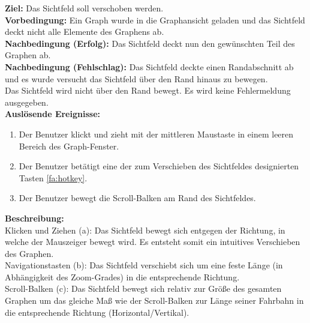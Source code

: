 \label{fa:verschieben}
\textbf{Ziel:} Das Sichtfeld soll verschoben werden.\\
\textbf{Vorbedingung:} Ein Graph wurde in die Graphansicht geladen und das Sichtfeld deckt nicht alle Elemente des Graphens ab.\\
\textbf{Nachbedingung (Erfolg):}  Das Sichtfeld deckt nun den gewünschten Teil des Graphen ab.\\
\textbf{Nachbedingung (Fehlschlag):} Das Sichtfeld deckte einen Randabschnitt ab und es wurde versucht das Sichtfeld über den Rand hinaus zu bewegen.\\
Das Sichtfeld wird nicht über den Rand bewegt. Es wird keine Fehlermeldung ausgegeben.\\
\textbf{Auslösende Ereignisse:}
\begin{enumerate}[nolistsep, label=(\alph*)]
  \item Der Benutzer klickt und zieht mit der mittleren Maustaste in einem leeren Bereich des Graph-Fenster.
  \item Der Benutzer betätigt eine der zum Verschieben des Sichtfeldes designierten Tasten \ref{fa:hotkey}.
  \item Der Benutzer bewegt die Scroll-Balken am Rand des Sichtfeldes. %
\end{enumerate}
\textbf{Beschreibung:}\\
Klicken und Ziehen (a): Das Sichtfeld bewegt sich entgegen der Richtung, in welche der Mauszeiger bewegt wird. Es entsteht somit ein intuitives Verschieben des Graphen.\\
Navigationstasten (b): Das Sichtfeld verschiebt sich um eine feste Länge (in Abhängigkeit des Zoom-Grades) in die entsprechende Richtung.\\
Scroll-Balken (c): Das Sichtfeld bewegt sich relativ zur Größe des gesamten Graphen um das gleiche Maß wie der Scroll-Balken zur Länge seiner Fahrbahn in die entsprechende Richtung (Horizontal/Vertikal).\\


